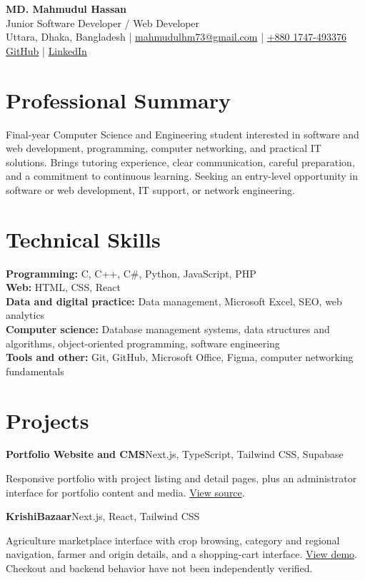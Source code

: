\documentclass[10pt,a4paper]{article}
\newcommand{\entry}[2]{%
  \textbf{#1}\hfill{\small\color{muted}#2}\par
}
\begin{document}
\begin{center}
  {\LARGE\bfseries MD. Mahmudul Hassan}\\[4pt]
  {\normalsize Junior Software Developer / Web Developer}\\[6pt]
  Uttara, Dhaka, Bangladesh
  \enspace|\enspace
  \href{mailto:mahmudulhm73@gmail.com}{mahmudulhm73@gmail.com}
  \enspace|\enspace
  \href{tel:+8801747493376}{+880 1747-493376}\\[3pt]
  \href{https://github.com/mhasnx}{GitHub}
  \enspace|\enspace
  \href{https://www.linkedin.com/in/mhmasum-ptec02}{LinkedIn}
\end{center}

\section*{Professional Summary}
Final-year Computer Science and Engineering student interested in software and
web development, programming, computer networking, and practical IT solutions.
Brings tutoring experience, clear communication, careful preparation, and a
commitment to continuous learning. Seeking an entry-level opportunity in
software or web development, IT support, or network engineering.

\section*{Technical Skills}
\textbf{Programming:} C, C++, C\#, Python, JavaScript, PHP\\
\textbf{Web:} HTML, CSS, React\\
\textbf{Data and digital practice:} Data management, Microsoft Excel, SEO,
web analytics\\
\textbf{Computer science:} Database management systems, data structures and
algorithms, object-oriented programming, software engineering\\
\textbf{Tools and other:} Git, GitHub, Microsoft Office, Figma, computer
networking fundamentals

\section*{Projects}
\entry{Portfolio Website and CMS}{Next.js, TypeScript, Tailwind CSS, Supabase}
Responsive portfolio with project listing and detail pages, plus an
administrator interface for portfolio content and media.
\href{https://github.com/mhasnx/-MASUM-PORTFOLIO}{View source}.

\entry{KrishiBazaar}{Next.js, React, Tailwind CSS}
Agriculture marketplace interface with crop browsing, category and regional
navigation, farmer and origin details, and a shopping-cart interface.
\href{https://krishibazaar-frontend.vercel.app}{View demo}.
Checkout and backend behavior have not been independently verified.
\end{document}
